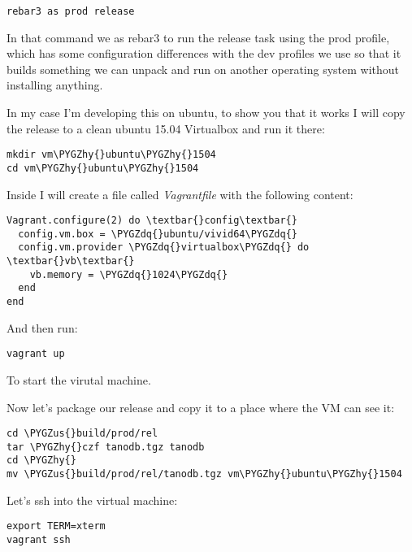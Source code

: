 \documentclass[letterpaper,10pt,english]{sphinxmanual}
\def\PYGZus{\char`\_}
\def\PYGZhy{\char`\-}
\def\PYGZdq{\char`\"}
\begin{document}
\begin{Verbatim}[commandchars=\\\{\}]
rebar3 as prod release
\end{Verbatim}

In that command we as rebar3 to run the release task using the prod profile,
which has some configuration differences with the dev profiles we use so that
it builds something we can unpack and run on another operating system without
installing anything.

In my case I'm developing this on ubuntu, to show you that it works I will
copy the release to a clean ubuntu 15.04 Virtualbox and run it there:

\begin{Verbatim}[commandchars=\\\{\}]
mkdir vm\PYGZhy{}ubuntu\PYGZhy{}1504
cd vm\PYGZhy{}ubuntu\PYGZhy{}1504
\end{Verbatim}

Inside I will create a file called \emph{Vagrantfile} with the following
content:

\begin{Verbatim}[commandchars=\\\{\}]
Vagrant.configure(2) do \textbar{}config\textbar{}
  config.vm.box = \PYGZdq{}ubuntu/vivid64\PYGZdq{}
  config.vm.provider \PYGZdq{}virtualbox\PYGZdq{} do \textbar{}vb\textbar{}
    vb.memory = \PYGZdq{}1024\PYGZdq{}
  end
end
\end{Verbatim}

And then run:

\begin{Verbatim}[commandchars=\\\{\}]
vagrant up
\end{Verbatim}

To start the virutal machine.

Now let's package our release and copy it to a place where the VM can see it:

\begin{Verbatim}[commandchars=\\\{\}]
cd \PYGZus{}build/prod/rel
tar \PYGZhy{}czf tanodb.tgz tanodb
cd \PYGZhy{}
mv \PYGZus{}build/prod/rel/tanodb.tgz vm\PYGZhy{}ubuntu\PYGZhy{}1504
\end{Verbatim}

Let's ssh into the virtual machine:

\begin{Verbatim}[commandchars=\\\{\}]
export TERM=xterm
vagrant ssh
\end{Verbatim}
\end{document}
